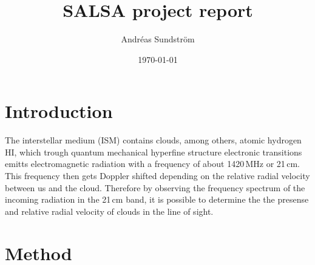 \documentclass[11pt,a4paper, twocolumn,
swedish, english %
]{article}
\begin{document}


\title{SALSA project report}
\author{Andréas Sundström}
\date{\today}


\twocolumn[
\begin{@twocolumnfalse}
\maketitle
\begin{abstract}

\end{abstract}
\end{@twocolumnfalse}
]



\section{Introduction}
The interstellar medium (ISM) contains clouds, among others, atomic
hydrogen HI, which trough quantum mechanical hyperfine structure
electronic transitions emitts electromagnetic radiation with a
frequency of about 1420\,MHz or 21\,cm. This frequency then gets
Doppler shifted depending on the relative radial velocity between us
and the cloud. Therefore by observing the frequency spectrum of the
incoming radiation in the 21\,cm band, it is possible to determine the
the presense and relative radial velocity of clouds in the line of
sight. 


\section{Method}

\clearpage %
\end{document}
